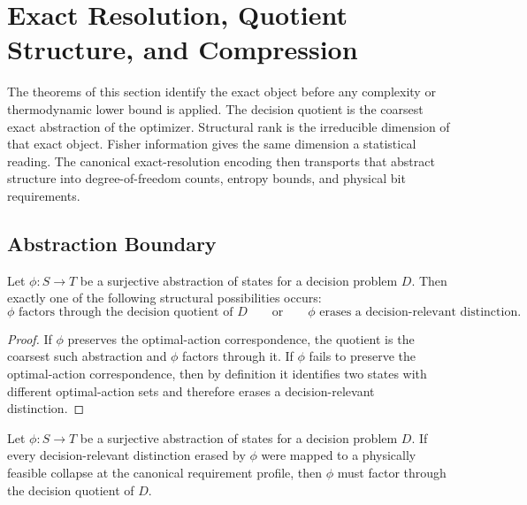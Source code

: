 \section{Exact Resolution, Quotient Structure, and Compression}\label{probability-model}

The theorems of this section identify the exact object before any complexity or thermodynamic lower bound is applied. The decision quotient is the coarsest exact abstraction of the optimizer. Structural rank is the irreducible dimension of that exact object. Fisher information gives the same dimension a statistical reading. The canonical exact-resolution encoding then transports that abstract structure into degree-of-freedom counts, entropy bounds, and physical bit requirements.

\subsection{Abstraction Boundary}

\begin{theorem}\label{thm:abstraction-factors-or-erases}
Let $\phi : S \to T$ be a surjective abstraction of states for a decision problem $D$. Then exactly one of the following structural possibilities occurs:
\[
\text{$\phi$ factors through the decision quotient of $D$}
\qquad\text{or}\qquad
\text{$\phi$ erases a decision-relevant distinction.}
\]
\end{theorem}

\begin{proof}
If $\phi$ preserves the optimal-action correspondence, the quotient is the coarsest such abstraction and $\phi$ factors through it. If $\phi$ fails to preserve the optimal-action correspondence, then by definition it identifies two states with different optimal-action sets and therefore erases a decision-relevant distinction.
\end{proof}

\begin{theorem}\label{thm:feasible-collapse-factors}
Let $\phi : S \to T$ be a surjective abstraction of states for a decision problem $D$. If every decision-relevant distinction erased by $\phi$ were mapped to a physically feasible collapse at the canonical requirement profile, then $\phi$ must factor through the decision quotient of $D$.
\end{theorem}

